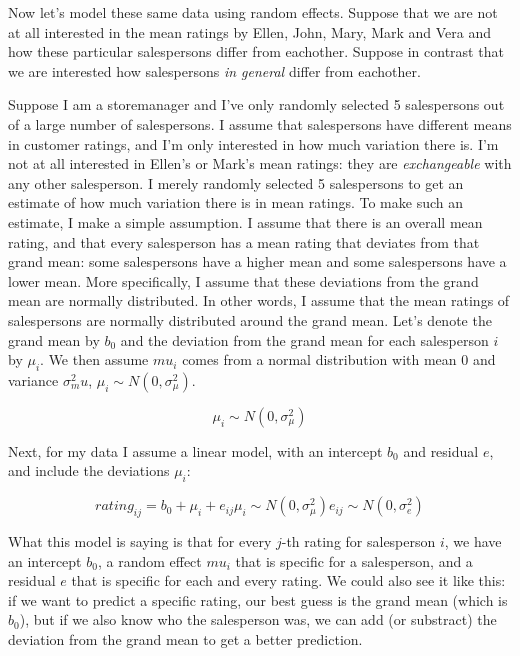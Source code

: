 Now let's model these same data using random effects. Suppose that we are not at all interested in the mean ratings by Ellen, John, Mary, Mark and Vera and how these particular salespersons differ from eachother. Suppose in contrast that we are interested how salespersons \textit{in general} differ from eachother.

Suppose I am a storemanager and I've only randomly selected 5 salespersons out of a large number of salespersons. I assume that salespersons have different means in customer ratings, and I'm only interested in how much variation there is. I'm not at all interested in Ellen's or Mark's mean ratings: they are \textit{exchangeable} with any other salesperson. I merely randomly selected 5 salespersons to get an estimate of how much variation there is in mean ratings. To make such an estimate, I make a simple assumption. I assume that there is an overall mean rating, and that every salesperson has a mean rating that deviates from that grand mean: some salespersons have a higher mean and some salespersons have a lower mean. More specifically, I assume that these deviations from the grand mean are normally distributed. In other words, I assume that the mean ratings of salespersons are normally distributed around the grand mean. Let's denote the grand mean by $b_0$ and the deviation from the grand mean for each salesperson $i$ by $\mu_i$. We then assume $mu_i$ comes from a normal distribution with mean 0 and variance $\sigma^2_mu$, $\mu_i \sim N(0, \sigma^2_\mu)$.

\begin{equation}
\mu_i \sim N(0, \sigma^2_\mu)
\end{equation}

Next, for my data I assume a linear model, with an intercept $b_0$ and residual $e$, and include the deviations $\mu_i$:

\begin{equation}
rating_{ij} = b_0 + \mu_i + e_{ij}
\mu_i \sim N(0, \sigma^2_\mu)
e_{ij} \sim N(0, \sigma^2_e)
\end{equation}

What this model is saying is that for every $j$-th rating for salesperson $i$, we have an intercept $b_0$, a random effect $mu_i$ that is specific for a salesperson, and a residual $e$ that is specific for each and every rating. We could also see it like this: if we want to predict a specific rating, our best guess is the grand mean (which is $b_0$), but if we also know who the salesperson was, we can add (or substract) the deviation from the grand mean to get a better prediction.

